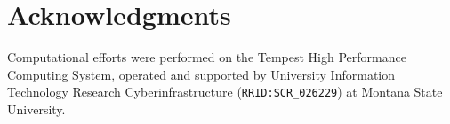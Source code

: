 \documentclass[11p]{article}
\begin{document}
\section{Acknowledgments}

Computational efforts were performed on the Tempest High Performance Computing System, operated and supported by University Information Technology Research Cyberinfrastructure (\texttt{RRID:SCR\_026229}) at Montana State University.

\clearpage

\printbibliography[
heading=bibintoc,
title={References}
]
\end{document}
